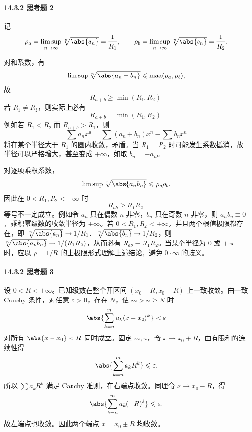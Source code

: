 \paragraph{14.3.2 思考题 2}
\begin{xsolution}
记
\[
  \rho_a=\limsup_{n\to\infty}\sqrt[n]{\abs{a_n}}=\frac1{R_1},
  \qquad
  \rho_b=\limsup_{n\to\infty}\sqrt[n]{\abs{b_n}}=\frac1{R_2}.
\]

对和系数，有
\[
  \limsup\sqrt[n]{\abs{a_n+b_n}}
  \leqslant\max(\rho_a,\rho_b),
\]
故
\[
  R_{a+b}\geqslant\min(R_1,R_2).
\]
若 $R_1\ne R_2$，则实际上必有
\[
  R_{a+b}=\min(R_1,R_2).
\]
例如若 $R_1<R_2$ 而 $R_{a+b}>R_1$，则
\[
  \sum a_nx^n=\sum(a_n+b_n)x^n-\sum b_nx^n
\]
将在某个半径大于 $R_1$ 的圆内收敛，矛盾。当 $R_1=R_2$ 时可能发生系数抵消，故半径可以严格增大，甚至变成 $+\infty$，如取 $b_n=-a_n$。

对逐项乘积系数，
\[
  \limsup\sqrt[n]{\abs{a_nb_n}}
  \leqslant\rho_a\rho_b.
\]
因此在 $0<R_1,R_2<+\infty$ 时
\[
  R_{ab}\geqslant R_1R_2.
\]
等号不一定成立。例如令 $a_n$ 只在偶数 $n$ 非零，$b_n$ 只在奇数 $n$ 非零，则 $a_nb_n\equiv0$，乘积幂级数的收敛半径为 $+\infty$。若 $0<R_1,R_2<+\infty$，并且两个根值极限都存在，即 $\sqrt[n]{\abs{a_n}}\to1/R_1$、$\sqrt[n]{\abs{b_n}}\to1/R_2$，则 $\sqrt[n]{\abs{a_nb_n}}\to1/(R_1R_2)$，从而必有 $R_{ab}=R_1R_2$。当某个半径为 $0$ 或 $+\infty$ 时，应以 $\rho=1/R$ 的上极限形式理解上述结论，避免 $0\cdot\infty$ 的歧义。
\end{xsolution}

\paragraph{14.3.2 思考题 3}
\begin{xsolution}
设 $0<R<+\infty$。已知级数在整个开区间 $(x_0-R,x_0+R)$ 上一致收敛。由一致 Cauchy 条件，对任意 $\varepsilon>0$，存在 $N$，使 $m>n\geqslant N$ 时
\[
  \abs{\sum_{k=n}^{m}a_k(x-x_0)^k}<\varepsilon
\]
对所有 $\abs{x-x_0}<R$ 同时成立。固定 $m,n$，令 $x\to x_0+R$，由有限和的连续性得
\[
  \abs{\sum_{k=n}^{m}a_kR^k}\leqslant\varepsilon.
\]
所以 $\sum a_kR^k$ 满足 Cauchy 准则，在右端点收敛。同理令 $x\to x_0-R$，得
\[
  \abs{\sum_{k=n}^{m}a_k(-R)^k}\leqslant\varepsilon,
\]
故左端点也收敛。因此两个端点 $x=x_0\pm R$ 均收敛。
\end{xsolution}

